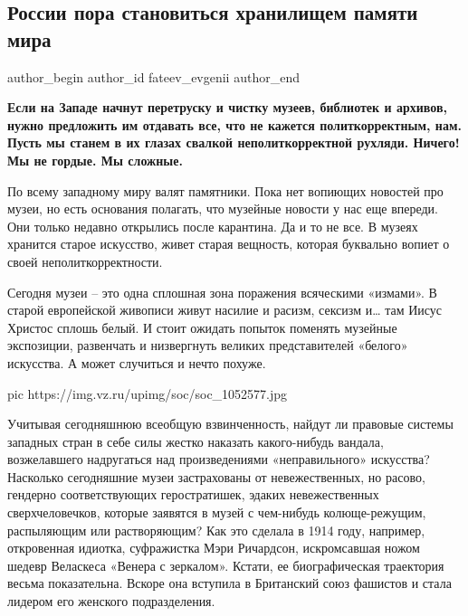  
 
 
 
 
 
\subsection{России пора становиться хранилищем памяти мира}
\label{sec:31_07_2020.news.ru.vz.fateev_evgenii.1.russia_pamjat_mira}
\ifcmt
	author_begin
   author_id fateev_evgenii
	author_end
\fi
{}

\textbf{Если на Западе начнут перетруску и чистку музеев, библиотек и архивов, нужно
предложить им отдавать все, что не кажется политкорректным, нам. Пусть мы
станем в их глазах свалкой неполиткорректной рухляди. Ничего! Мы не гордые. Мы
сложные.}


По всему западному миру валят памятники. Пока нет вопиющих новостей про музеи,
но есть основания полагать, что музейные новости у нас еще впереди. Они только
недавно открылись после карантина. Да и то не все. В музеях хранится старое
искусство, живет старая вещность, которая буквально вопиет о своей
неполиткорректности.

Сегодня музеи – это одна сплошная зона поражения всяческими «измами». В старой
европейской живописи живут насилие и расизм, сексизм и… там Иисус Христос
сплошь белый. И стоит ожидать попыток поменять музейные экспозиции, развенчать
и низвергнуть великих представителей «белого» искусства. А может случиться и
нечто похуже. 

\ifcmt
pic https://img.vz.ru/upimg/soc/soc_1052577.jpg
\fi

Учитывая сегодняшнюю всеобщую взвинченность, найдут ли правовые системы
западных стран в себе силы жестко наказать какого-нибудь вандала, возжелавшего
надругаться над произведениями «неправильного» искусства? Насколько сегодняшние
музеи застрахованы от невежественных, но расово, гендерно соответствующих
геростратишек, эдаких невежественных сверхчеловечков, которые заявятся в музей
с чем-нибудь колюще-режущим, распыляющим или растворяющим? Как это сделала в
1914 году, например, откровенная идиотка, суфражистка Мэри Ричардсон,
искромсавшая ножом шедевр Веласкеса «Венера с зеркалом». Кстати, ее
биографическая траектория весьма показательна. Вскоре она вступила в Британский
союз фашистов и стала лидером его женского подразделения.

